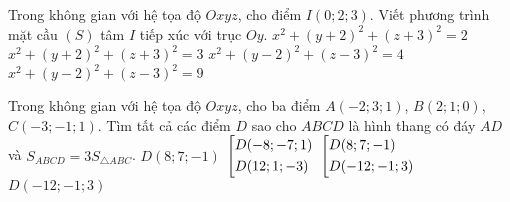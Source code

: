 \begin{ex}%
	Trong không gian với hệ tọa độ $Oxyz$, cho điểm $I(0;2;3)$. Viết phương trình mặt cầu $(S)$  tâm $I$ tiếp xúc với trục $Oy$.
	\choice
	{$ x^2+(y+2)^2+(z+3)^2=2$}
	{$ x^2+(y+2)^2+(z+3)^2=3$}
	{$ x^2+(y-2)^2+(z-3)^2=4 $}
	{\True $ x^2+(y-2)^2+(z-3)^2=9 $}
\end{ex}

\begin{ex}%
	Trong không gian với hệ tọa độ $Oxyz$, cho ba điểm $A(-2;3;1)$, $B(2;1;0)$, $C(-3;-1;1)$. Tìm tất cả các điểm $D$ sao cho $ABCD$ là hình thang có đáy $AD$ và $S_{ABCD}=3S_{\triangle ABC}$.
	\choice
	{$ D(8;7;-1)$}
	{$\left[\begin{aligned}&D(-8;-7;1)\\&D(12;1;-3)\end{aligned}\right. $}
	{$\left[\begin{aligned}&D(8;7;-1)\\&D(-12;-1;3)\end{aligned}\right. $}
	{\True $ D(-12;-1;3)$}
\end{ex}



